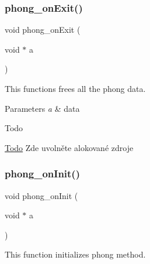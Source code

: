\subsubsection{\texorpdfstring{phong\+\_\+on\+Exit()}{phong\_onExit()}}
{\footnotesize\ttfamily void phong\+\_\+on\+Exit (\begin{DoxyParamCaption}\item[{void $\ast$}]{a }\end{DoxyParamCaption})}



This functions frees all the phong data. 


\begin{DoxyParams}{Parameters}
{\em a} & data \\
\hline
\end{DoxyParams}
\begin{DoxyRefDesc}{Todo}
\item[\hyperlink{todo__todo000006}{Todo}]Zde uvolněte alokované zdroje \end{DoxyRefDesc}
\mbox{\label{group__cpu__side_gab4efb950833c87be9cd3b3850be50e77}} 
\subsubsection{\texorpdfstring{phong\+\_\+on\+Init()}{phong\_onInit()}}
{\footnotesize\ttfamily void phong\+\_\+on\+Init (\begin{DoxyParamCaption}\item[{void $\ast$}]{a }\end{DoxyParamCaption})}



This function initializes phong method. 


